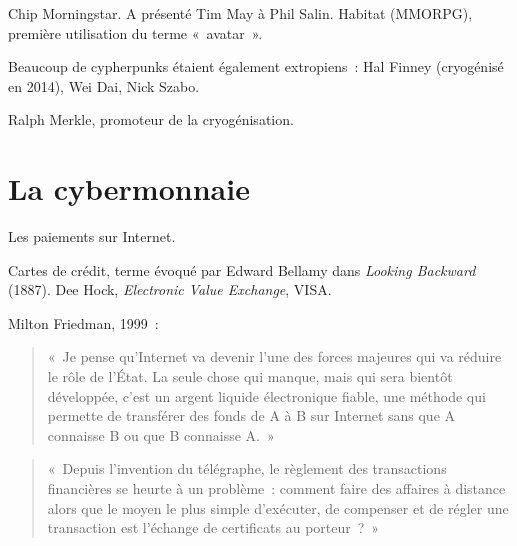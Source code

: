 Chip Morningstar. A présenté Tim May à Phil Salin. Habitat (MMORPG), première utilisation du terme «~avatar~».





Beaucoup de cypherpunks étaient également extropiens~: Hal Finney (cryogénisé en 2014), Wei Dai, Nick Szabo.

Ralph Merkle, promoteur de la cryogénisation.

\section{La cybermonnaie}

Les paiements sur Internet.

Cartes de crédit, terme évoqué par Edward Bellamy dans \emph{Looking Backward} (1887). Dee Hock, \emph{Electronic Value Exchange}, VISA.

Milton Friedman, 1999~:

\begin{quote}
«~Je pense qu'Internet va devenir l'une des forces majeures qui va réduire le rôle de l'État. La seule chose qui manque, mais qui sera bientôt développée, c'est un argent liquide électronique fiable, une méthode qui permette de transférer des fonds de A à B sur Internet sans que A connaisse B ou que B connaisse A.~»
\end{quote}


\begin{quote}
«~Depuis l'invention du télégraphe, le règlement des transactions financières se heurte à un problème~: comment faire des affaires à distance alors que le moyen le plus simple d'exécuter, de compenser et de régler une transaction est l'échange de certificats au porteur~?~»
\end{quote}



